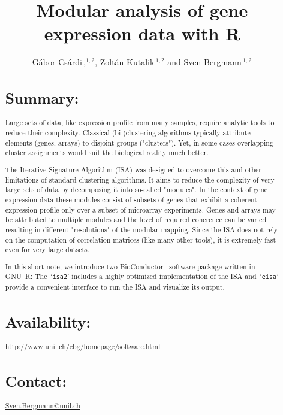 \documentclass{bioinfo}
\newcommand{\Rpackage}[1]{`\texttt{#1}'}
\begin{document}

\title[Modular analysis]{Modular analysis of gene expression data with R}
\author[G\'abor Cs\'ardi \textit{et~al}]{G\'abor Cs\'ardi\,,$^{1,2}$,
  Zolt\'an Kutalik\,$^{1,2}$ and Sven Bergmann\,$^{1,2}$}
\address{$^{1}$Department of Medical Genetics, and
  $^{2}$Swiss Institute of Bioinformatics,
  University of Lausanne, Rue de Bugnon 27, CH-1005 Lausanne,
  Switzerland.}



\maketitle

\begin{abstract}
\section{Summary:}
Large sets of data, like expression profile from many samples, require
analytic tools to reduce their complexity. Classical (bi-)clustering
algorithms typically attribute elements (genes, arrays) to disjoint groups
("clusters"). Yet, in some cases overlapping cluster assignments would suit
the biological reality much better.

The Iterative Signature Algorithm (ISA) was designed to overcome this and
other limitations of standard clustering algorithms. It aims to reduce the
complexity of very large sets of data by decomposing it into so-called
"modules". In the context of gene expression data these modules consist of
subsets of genes that exhibit a coherent expression profile only over a
subset of microarray experiments. Genes and arrays may be attributed to
multiple modules and the level of required coherence can be varied resulting
in different "resolutions" of the modular mapping. Since the ISA does not
rely on the computation of correlation matrices (like many other tools), it
is extremely fast even for very large datsets.

In this short note, we introduce two BioConductor~\cite{BioC} software
package written in GNU~R: The~\Rpackage{isa2} includes a highly optimized
implementation of the ISA and~\Rpackage{eisa} provide a convenient interface
to run the ISA and visualize its output.

\section{Availability:}
\href{http://www.unil.ch/cbg/homepage/software.html}%
{http://www.unil.ch/cbg/homepage/software.html}
\section{Contact:} \href{Sven.Bergmann@unil.ch}{Sven.Bergmann@unil.ch}
\end{abstract}
\end{document}
